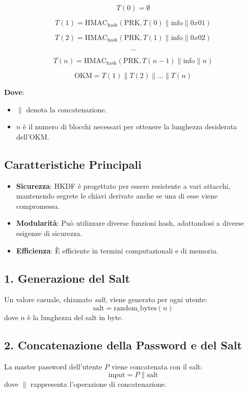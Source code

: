 \documentclass[a4paper,12pt]{report}
\begin{document}
		\[
		T(0) = \emptyset
		\]

		\[
		T(1) = \text{HMAC}_\text{hash}(\text{PRK}, T(0) \| \text{info} \| 0x01)
		\]

		\[
		T(2) = \text{HMAC}_\text{hash}(\text{PRK}, T(1) \| \text{info} \| 0x02)
		\]

		\[
		\ldots
		\]

		\[
		T(n) = \text{HMAC}_\text{hash}(\text{PRK}, T(n-1) \| \text{info} \| n)
		\]

		\[
		\text{OKM} = T(1) \| T(2) \| \ldots \| T(n)
		\]

		\textbf{Dove}:
		\begin{itemize}
			\item \(\| \) denota la concatenazione.
			\item \( n \) è il numero di blocchi necessari per ottenere la
			lunghezza desiderata dell'OKM.
		\end{itemize}

		\subsection*{Caratteristiche Principali}
		\begin{itemize}
			\item \textbf{Sicurezza}: HKDF è progettato per essere resistente a
			vari attacchi, mantenendo segrete le chiavi derivate anche se una di
			esse viene compromessa.
			\item \textbf{Modularità}: Può utilizzare diverse funzioni hash,
			adattandosi a diverse esigenze di sicurezza.
			\item \textbf{Efficienza}: È efficiente in termini computazionali e
			di memoria.
		\end{itemize}




		\subsection*{1. Generazione del Salt}
		Un valore casuale, chiamato \textit{salt}, viene generato per ogni utente:
		\[
		\text{salt} = \text{random\_bytes}(n)
		\]
		dove \( n \) è la lunghezza del salt in byte.

		\subsection*{2. Concatenazione della Password e del Salt}
		La master password dell'utente \( P \) viene concatenata con il salt:
		\[
		\text{input} = P \| \text{salt}
		\]
		dove \( \| \) rappresenta l'operazione di concatenazione.
\end{document}
